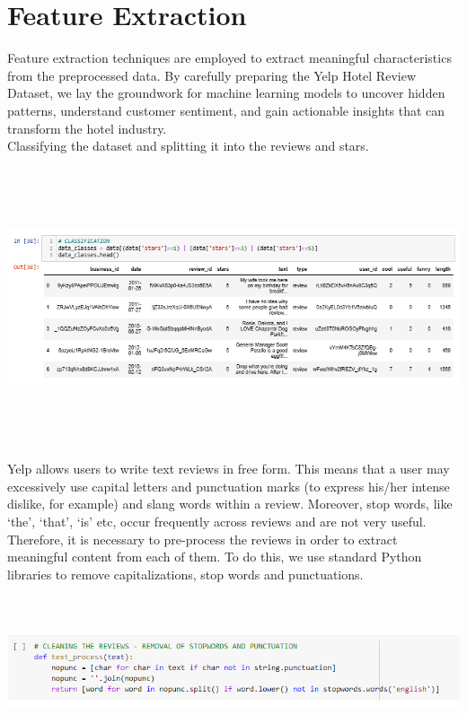 \documentclass[a4paper, 12pt]{report}
\begin{document}
\section{Feature Extraction}
Feature extraction techniques are employed to extract meaningful characteristics from the preprocessed data.
By carefully preparing the Yelp Hotel Review Dataset, we lay the groundwork for machine learning models to uncover hidden patterns, understand customer sentiment, and gain actionable insights that can transform the hotel industry.
\\Classifying the dataset and splitting it into the reviews and stars.\\
	\includegraphics[height=3.5in,width=6in]{10}\\
Yelp allows users to write text reviews in free form. This means that a user may excessively use capital letters and punctuation marks (to express his/her intense dislike, for example) and slang words within a review. Moreover, stop words, like ‘the’, ‘that’, ‘is’ etc, occur frequently across reviews and are not very useful.
Therefore, it is necessary to pre-process the reviews in order to extract meaningful content from each of them. To do this, we use standard Python libraries to remove capitalizations, stop words and punctuations.\\
	\includegraphics[height=2in,width=6in]{11}\\
\end{document}
